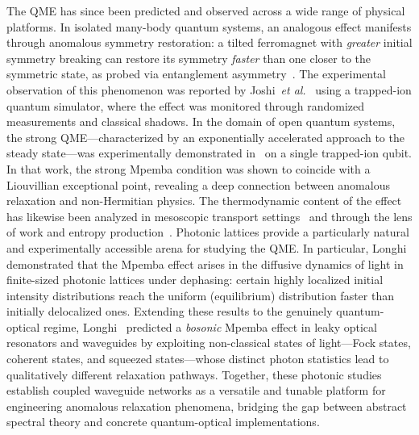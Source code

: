 \documentclass[pdflatex,sn-mathphys-num]{sn-jnl}
\begin{document}
The QME has since been predicted and observed across a wide range of physical platforms.
In isolated many-body quantum systems, an analogous effect manifests
through anomalous symmetry restoration: a tilted ferromagnet with
\emph{greater} initial symmetry breaking can restore its symmetry
\emph{faster} than one closer to the symmetric state, as probed
via entanglement asymmetry~\cite{Ares2023}.
The  experimental observation of this phenomenon was reported by Joshi~\emph{et al.}~\cite{Joshi2024} using a trapped-ion quantum simulator, where the effect was monitored through randomized measurements and classical shadows.
In the domain of open quantum systems, the strong QME---characterized
by an exponentially accelerated approach to the steady state---was
experimentally demonstrated in~\cite{Zhang2025} on a single trapped-ion qubit.
In that work, the strong Mpemba condition was shown to coincide with a Liouvillian exceptional point,
revealing a deep connection between anomalous relaxation and non-Hermitian physics. The thermodynamic content of the effect has likewise been analyzed in mesoscopic transport settings~\cite{Chatterjee2023} and through the lens of work and entropy production~\cite{Moroder2024}. Photonic lattices provide a particularly natural and experimentally
accessible arena for studying the QME. In particular, Longhi~\cite{Longhi2024} demonstrated that the Mpemba effect arises
in the diffusive dynamics of light in finite-sized photonic lattices under dephasing: certain highly localized initial intensity
distributions reach the uniform (equilibrium) distribution faster than initially delocalized ones.  
Extending these results to the genuinely quantum-optical regime,
Longhi~\cite{Longhi2024bosonic} predicted a \emph{bosonic} Mpemba
effect in leaky optical resonators and waveguides by exploiting
non-classical states of light---Fock states, coherent states, and
squeezed states---whose distinct photon statistics lead to
qualitatively different relaxation pathways.
Together, these photonic studies establish coupled waveguide networks
as a versatile and tunable platform for engineering anomalous
relaxation phenomena, bridging the gap between abstract spectral
theory and concrete quantum-optical implementations. 
\end{document}
